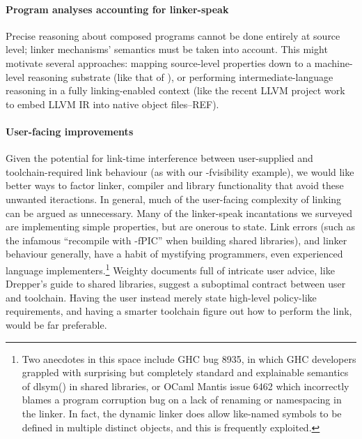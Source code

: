 \paragraph{Program analyses accounting for linker-speak}
Precise reasoning about composed programs cannot be done entirely at source level; 
linker mechanisms' semantics must be taken into account.
This might motivate several approaches: 
mapping source-level properties down to a
machine-level reasoning substrate (like that of \citet{balakrishnan_wysinyx_}),
or performing intermediate-language reasoning
in a fully linking-enabled context (like the recent LLVM project work
to embed LLVM IR into native object files--REF).

\paragraph{User-facing improvements}
Given the potential for link-time interference between user-supplied
and toolchain-required link behaviour (as with our \textsf{-fvisibility} example), 
we would like better ways to factor linker, compiler and library functionality
that avoid these unwanted iteractions.
In general, much of the user-facing complexity of linking
can be argued as unnecessary.
Many of the linker-speak incantations we surveyed 
are implementing simple properties, but are onerous to state. 
Link errors (such as the infamous ``recompile with -fPIC'' when building shared libraries),
and linker behaviour generally, have a habit of mystifying programmers,
even experienced language implementers.\footnote{Two 
anecdotes in this space include GHC bug 8935,
in which GHC developers grappled with surprising but completely standard
and explainable semantics of \textsf{dlsym()} in shared libraries, 
or OCaml Mantis issue 6462 which incorrectly blames a program corruption bug on a lack of 
renaming or namespacing in the linker.
In fact, the dynamic linker does allow like-named symbols to be defined in multiple 
distinct objects, and this is frequently exploited.}
Weighty documents full of intricate user advice, like Drepper's guide to shared libraries, 
suggest a suboptimal contract between user and toolchain.
Having the user instead merely state high-level policy-like requirements, 
and having a smarter toolchain figure out how to perform the link,
would be far preferable.


% 
% 
% 



